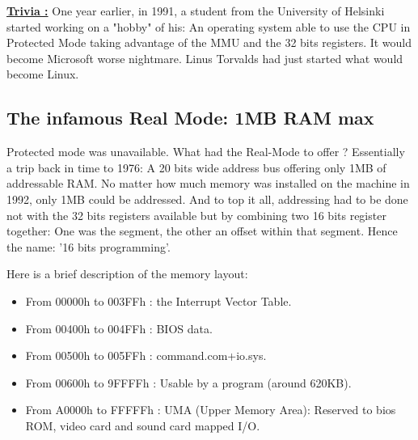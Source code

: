 \documentclass[book.tex]{subfiles}
\begin{document}
\bigskip

 \textbf{\underline{Trivia :}} One year earlier, in 1991, a student from the University of Helsinki started working on a "hobby" of his: An operating system able to use the CPU in Protected Mode taking advantage of the MMU and the 32 bits registers. It would become Microsoft worse nightmare. Linus Torvalds had just started what would become Linux.



  \subsection{The infamous Real Mode: 1MB RAM max}
  Protected mode was unavailable. What had the Real-Mode to offer ? Essentially a trip back in time to 1976: A 20 bits wide address bus offering only 1MB of addressable RAM. No matter how much memory was installed on the machine in 1992, only 1MB could be addressed. And to top it all, addressing had to be done not with the 32 bits registers available but by combining two 16 bits register together: One was the segment, the other an offset within that segment. Hence the name: '16 bits programming'.

  \bigskip
Here is a brief description of the memory layout: \\
\begin{itemize}
\item From 00000h to 003FFh : the Interrupt Vector Table.
\item From 00400h to 004FFh : BIOS data.
\item From 00500h to 005FFh : command.com+io.sys.
\item From 00600h to 9FFFFh : Usable by a program (around 620KB). 
\item From A0000h to FFFFFh : UMA (Upper Memory Area): Reserved to bios ROM, video card and sound card mapped I/O.
\end{itemize}
\end{document}
